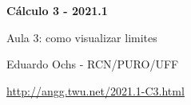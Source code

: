 \documentclass[oneside,12pt]{article}
\begin{document}


\long{}
\long{}
\long{}
\long{}
\long{}
\long{}
\long{}
\long{}
\long{}
\long{}
\long{}

\long{}
\long{}

\def\frown{\ensuremath{{=}{(}}}
\def\True {\mathbf{V}}
\def\False{\mathbf{F}}
\def\D    {\displaystyle}

\def\rq{\ColorRed{?}}
\def\undq#1{\underbrace{#1}_{\rq}}


\def\drafturl{http://angg.twu.net/LATEX/2021-1-C3.pdf}
\def\drafturl{http://angg.twu.net/2021.1-C3.html}
\def\draftfooter{\tiny \href{\drafturl}{\jobname{}} \ColorBrown{\shorttoday{} \hours}}



%

\thispagestyle{empty}

\begin{center}

\vspace*{1.2cm}

{\bf \Large Cálculo 3 - 2021.1}

\bsk

Aula 3: como visualizar limites

\bsk

Eduardo Ochs - RCN/PURO/UFF

\url{http://angg.twu.net/2021.1-C3.html}

\end{center}
\end{document}
